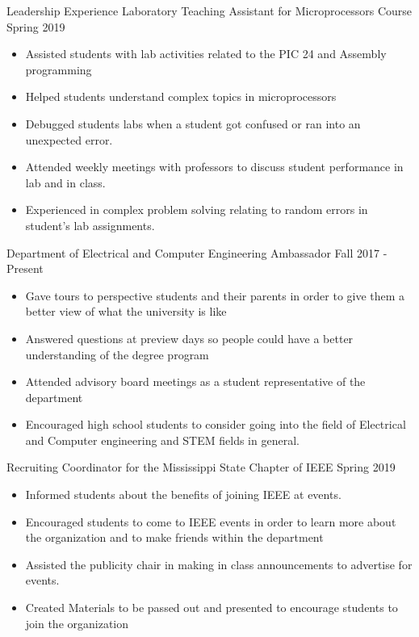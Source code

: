 \documentclass{resume} %
\begin{document}

\begin{rSection}{Leadership Experience}
Laboratory Teaching Assistant for Microprocessors Course \hfill Spring 2019 
\begin{itemize}
    \item Assisted students with lab activities related to the PIC 24 and Assembly programming
    \item Helped students understand complex topics in microprocessors
    \item Debugged students labs when a student got confused or ran into an unexpected error. 
    \item Attended weekly meetings with professors to discuss student performance in lab and in class.
    \item Experienced in complex problem solving relating to random errors in student's lab assignments. \\
\end{itemize}

Department of Electrical and Computer Engineering Ambassador \hfill Fall 2017 - Present
\begin{itemize}
    \item Gave tours to perspective students and their parents in order to give them a better view of what the university is like
    \item Answered questions at preview days so people could have a better understanding of the degree program
    \item Attended advisory board meetings as a student representative of the department
    \item Encouraged high school students to consider going into the field of Electrical and Computer engineering and STEM fields in general.\\ 
\end{itemize}

Recruiting Coordinator for the Mississippi State Chapter of IEEE \hfill Spring 2019
\begin{itemize}
    \item Informed students about the benefits of joining IEEE at events. 
    \item Encouraged students to come to IEEE events in order to learn more about the organization and to make friends within the department
    \item Assisted the publicity chair in making in class announcements to advertise for events. 
    \item Created Materials to be passed out and presented to encourage students to join the organization\\
\end{itemize}


\end{rSection}
\end{document}
